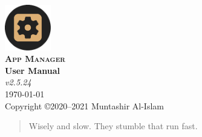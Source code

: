 \begin{titlingpage}
	\pagecolor{SunTan}
	\centering
	\includegraphics[width=2cm]{./images/icon}\\\vspace{1cm}
	{\scshape\Huge\bfseries App Manager \\}
	\vspace{2.5cm}
	{\huge\bfseries User Manual\\}
	\vspace{.5cm}
	{\Large\itshape v2.5.24\\}
	\vfill
	{\large \today\\}
	\vfill
	{Copyright \copyright 2020--2021 Muntashir Al-Islam\\}
	\pagebreak
	\pagecolor{white}
	\begin{quotation}
		Wisely and slow. They stumble that run fast.
	\end{quotation}
\end{titlingpage}
